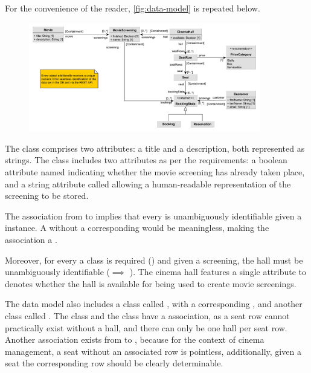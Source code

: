 For the convenience of the reader, \cref{fig:data-model} is repeated below.
\vspace{-.2cm}
\begin{figure}[H]
    \centering
    \includegraphics[width=0.9\textwidth]{images/data-model-final-enum}
\end{figure}
\vspace{-.6cm}

The class  comprises two attributes: a title and a description, both represented as strings. The  class includes two attributes as per the requirements: a boolean attribute named  indicating whether the movie screening has already taken place, and a string attribute called  allowing a human-readable representation of the screening to be stored.

The association from  to  implies that every  is unambiguously identifiable given a  instance. A  without a corresponding  would be meaningless, making the association a \containment.

Moreover, for every  a  class is required (\surjectivity) and given a screening, the hall must be unambiguously identifiable (\injectivity $\implies$ \containment). The cinema hall features a single attribute to denotes whether the hall is available for being used to create movie screenings.

The data model also includes a class called , with a corresponding , and another class called . The  class and the  class have a \containment association, as a seat row cannot practically exist without a hall, and there can only be one hall per seat row. Another \containment association exists from  to , because for the context of cinema management, a seat without an associated row is pointless, additionally, given a seat the corresponding row should be clearly determinable.

